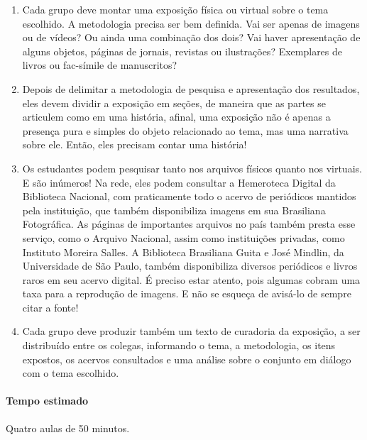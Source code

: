 \documentclass[12pt]{extarticle}
\begin{document}
\begin{enumerate}
\begin{itemize}
   

\end{itemize}




\item Cada grupo deve montar uma exposição física ou virtual sobre o tema
escolhido. A metodologia precisa ser bem definida. Vai ser apenas de
imagens ou de vídeos? Ou ainda uma combinação dos dois? Vai haver
apresentação de alguns objetos, páginas de jornais, revistas ou
ilustrações? Exemplares de livros ou fac-símile de manuscritos?

\item Depois de delimitar a metodologia de pesquisa e apresentação dos
resultados, eles devem dividir a exposição em seções, de maneira que as
partes se articulem como em uma história, afinal, uma exposição não é
apenas a presença pura e simples do objeto relacionado ao tema, mas uma
narrativa sobre ele. Então, eles precisam contar uma história!

\item Os estudantes podem pesquisar tanto nos arquivos físicos quanto nos
virtuais. E são inúmeros! Na rede, eles podem consultar a Hemeroteca
Digital da Biblioteca Nacional, com praticamente todo o acervo de
periódicos mantidos pela instituição, que também disponibiliza imagens
em sua Brasiliana Fotográfica. As páginas de importantes arquivos no
país também presta esse serviço, como o Arquivo Nacional, assim como
instituições privadas, como Instituto Moreira Salles. A Biblioteca
Brasiliana Guita e José Mindlin, da Universidade de São Paulo, também
disponibiliza diversos periódicos e livros raros em seu acervo digital.
É preciso estar atento, pois algumas cobram uma taxa para a reprodução
de imagens. E não se esqueça de avisá-lo de sempre citar a fonte!

\item Cada grupo deve produzir também um texto de curadoria da exposição, a
ser distribuído entre os colegas, informando o tema, a metodologia, os
itens expostos, os acervos consultados e uma análise sobre o conjunto em
diálogo com o tema escolhido.
\end{enumerate}

\paragraph{Tempo estimado} Quatro aulas de 50 minutos.
\end{document}
